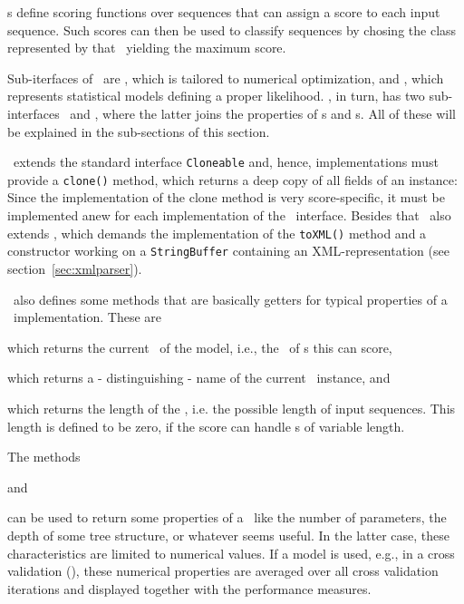 
\SeqScore s define scoring functions over sequences that can assign a score to each input sequence. Such scores can then be used
to classify sequences by chosing the class represented by that \SeqScore~yielding the maximum score.

Sub-iterfaces of \SeqScore~are \DiffSS, which is tailored to numerical optimization, and \StatMod, which represents statistical models 
defining a proper likelihood. \StatMod, in turn, has two sub-interfaces \TrainSM~and \DiffSM, where the latter joins the properties of \StatMod s and \DiffSS s. All of these will be explained in the sub-sections of this section.

\renewcommand{\codefile}{../../de/jstacs/sequenceScores/SequenceScore.java}
\setcounter{off}{47}

\SeqScore~extends the standard interface \lstinline+Cloneable+ and, hence, implementations must provide a \lstinline+clone()+ method, which returns a deep copy of all fields of an instance:
Since the implementation of the clone method is very score-specific, it must be implemented anew for each implementation of the \SeqScore~interface. Besides that \SeqScore~also extends \Storable, which demands the implementation of the \lstinline+toXML()+ method and a constructor working on a \lstinline+StringBuffer+ containing an XML-representation (see section~\ref{sec:xmlparser}).

\SeqScore~also defines some methods that are basically getters for typical properties of a \SeqScore~implementation. 
These are
\addtocounter{off}{7}
which returns the current \AlphabetContainer~of the model, i.e., the \AlphabetContainer~of \Sequence s this \SeqScore can score,
\addtocounter{off}{7}
which returns a - distinguishing - name of the current \SeqScore~instance, and
\addtocounter{off}{10}
which returns the length of the \SeqScore, i.e. the possible length of input sequences. This length is defined to be zero, if the score can handle \Sequence s of variable length.

The methods
\addtocounter{off}{17}
and
\addtocounter{off}{11}
can be used to return some properties of a \SeqScore~like the number of parameters, the depth of some tree structure, or whatever seems useful. In the latter case, these characteristics are limited to numerical values. If a model is used, e.g., in a cross validation (\KFoldCrossValidation), these numerical properties are averaged over all cross validation iterations and displayed together with the performance measures.

